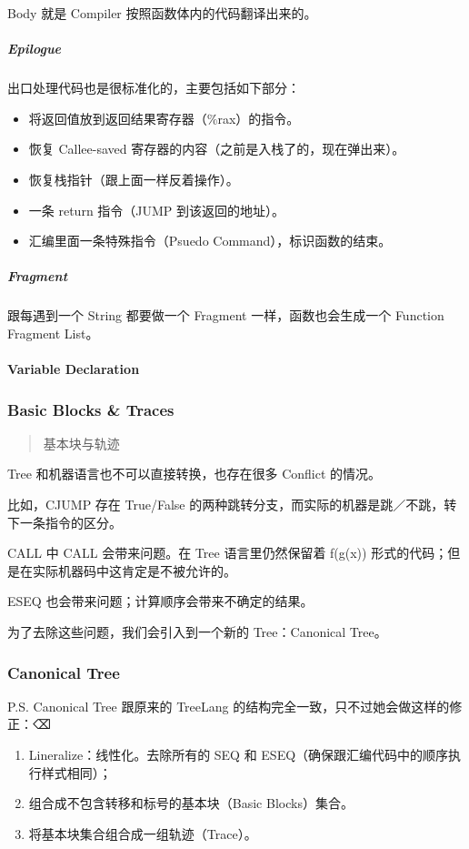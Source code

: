 \documentclass[
]{article}
\begin{document}
Body 就是 Compiler 按照函数体内的代码翻译出来的。

\hypertarget{header-n90}{%
\subparagraph{Epilogue}\label{header-n90}}

出口处理代码也是很标准化的，主要包括如下部分：

\begin{itemize}
\item
  将返回值放到返回结果寄存器（\%rax）的指令。
\item
  恢复 Callee-saved 寄存器的内容（之前是入栈了的，现在弹出来）。
\item
  恢复栈指针（跟上面一样反着操作）。
\item
  一条 return 指令（JUMP 到该返回的地址）。
\item
  汇编里面一条特殊指令（Psuedo Command），标识函数的结束。
\end{itemize}

\hypertarget{header-n103}{%
\subparagraph{Fragment}\label{header-n103}}

跟每遇到一个 String 都要做一个 Fragment 一样，函数也会生成一个 Function
Fragment List。

\hypertarget{header-n105}{%
\paragraph{Variable Declaration}\label{header-n105}}

\hypertarget{header-n106}{%
\subsubsection{Basic Blocks \& Traces}\label{header-n106}}

\begin{quote}
基本块与轨迹
\end{quote}

Tree 和机器语言也不可以直接转换，也存在很多 Conflict 的情况。

比如，CJUMP 存在 True/False
的两种跳转分支，而实际的机器是跳／不跳，转下一条指令的区分。

CALL 中 CALL 会带来问题。在 Tree 语言里仍然保留着 f(g(x))
形式的代码；但是在实际机器码中这肯定是不被允许的。

ESEQ 也会带来问题；计算顺序会带来不确定的结果。

为了去除这些问题，我们会引入到一个新的 Tree：Canonical Tree。

\hypertarget{header-n114}{%
\subsubsection{Canonical Tree}\label{header-n114}}

P.S. Canonical Tree 跟原来的 TreeLang
的结构完全一致，只不过她会做这样的修正：⌫

\begin{enumerate}
\def\labelenumi{\arabic{enumi}.}
\item
  Lineralize：线性化。去除所有的 SEQ 和
  ESEQ（确保跟汇编代码中的顺序执行样式相同）；
\item
  组合成不包含转移和标号的基本块（Basic Blocks）集合。
\item
  将基本块集合组合成一组轨迹（Trace）。
\end{enumerate}
\end{document}
